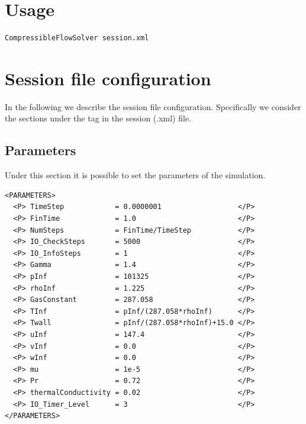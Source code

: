 \section{Usage}
\begin{lstlisting}[style=BashInputStyle]
CompressibleFlowSolver session.xml
\end{lstlisting}


\section{Session file configuration}
\label{sec:sessionFileComp}
In the following we describe the session file configuration. Specifically we consider the
sections under the tag  in the session (.xml) file.
\subsection*{Parameters}
Under this section it is possible to set the parameters of the simulation.
\begin{lstlisting}[style=XmlStyle]
<PARAMETERS>
  <P> TimeStep            = 0.0000001                  </P>
  <P> FinTime             = 1.0                        </P>
  <P> NumSteps            = FinTime/TimeStep           </P>
  <P> IO_CheckSteps       = 5000                       </P>
  <P> IO_InfoSteps        = 1                          </P>
  <P> Gamma               = 1.4                        </P>
  <P> pInf                = 101325                     </P>
  <P> rhoInf              = 1.225                      </P>
  <P> GasConstant         = 287.058                    </P>
  <P> TInf                = pInf/(287.058*rhoInf)      </P>
  <P> Twall               = pInf/(287.058*rhoInf)+15.0 </P>
  <P> uInf                = 147.4                      </P>
  <P> vInf                = 0.0                        </P>
  <P> wInf                = 0.0                        </P>
  <P> mu                  = 1e-5                       </P>
  <P> Pr                  = 0.72                       </P>
  <P> thermalConductivity = 0.02                       </P>
  <P> IO_Timer_Level      = 3                          </P>
</PARAMETERS>
\end{lstlisting}
